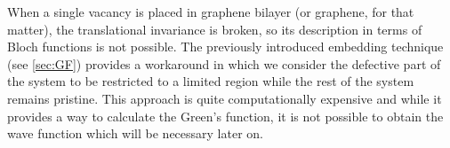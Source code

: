 %



When a single vacancy is placed in graphene bilayer (or graphene, for that matter), the translational invariance is broken, so its description in terms of Bloch functions is not possible. The previously introduced embedding technique (see \ref{sec:GF}) provides a workaround in which we consider the defective part of the system to be restricted to a limited region while the rest of the system remains pristine.
This approach is quite computationally expensive and while it provides a way to calculate the Green's function, it is not possible to obtain the wave function which will be necessary later on.

